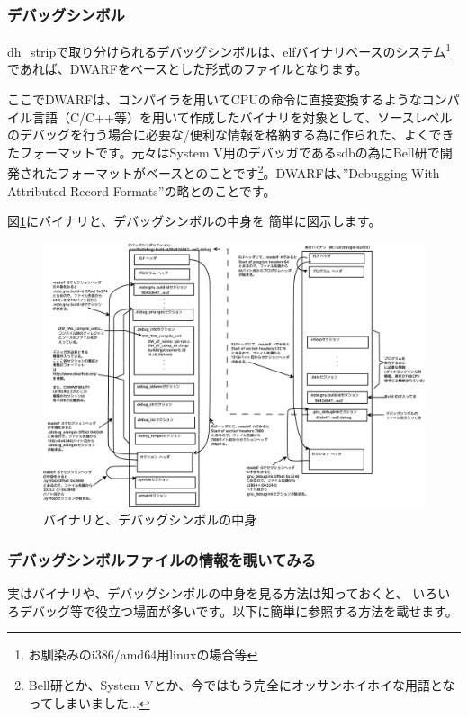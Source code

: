 \documentclass[mingoth,a4paper]{jsarticle}
\begin{document}
\subsubsection{デバッグシンボル}

 dh\_stripで取り分けられるデバッグシンボルは、elfバイナリベースのシステム\footnote{お馴染みのi386/amd64用linuxの場合等}であれば、DWARF\cite{dwarf-spec}をベースとした形式のファイルとなります。

 ここでDWARFは、コンパイラを用いてCPUの命令に直接変換するようなコンパイル言語（C/C++等）を用いて作成したバイナリを対象として、ソースレベルのデバッグを行う場合に必要な/便利な情報を格納する為に作られた、よくできたフォーマットです。元々はSystem V用のデバッガであるsdbの為にBell研で開発されたフォーマットがベースとのことです\footnote{Bell研とか、System Vとか、今ではもう完全にオッサンホイホイな用語となってしまいました...}。DWARFは、''Debugging With Attributed Record Formats''の略とのことです。

 図\ref{fig:dwarf-vs-elf-schema}にバイナリと、デバッグシンボルの中身を
簡単に図示します。

\begin{figure}[h]
\begin{center}
\includegraphics[width=0.8\hsize]{image201307/dwarf-elf-schema.eps}
 \caption{バイナリと、デバッグシンボルの中身}
 \label{fig:dwarf-vs-elf-schema}
\end{center}
\end{figure}

\subsubsection{デバッグシンボルファイルの情報を覗いてみる}
 
 実はバイナリや、デバッグシンボルの中身を見る方法は知っておくと、
いろいろデバッグ等で役立つ場面が多いです。以下に簡単に参照する方法を載せます。
\end{document}
